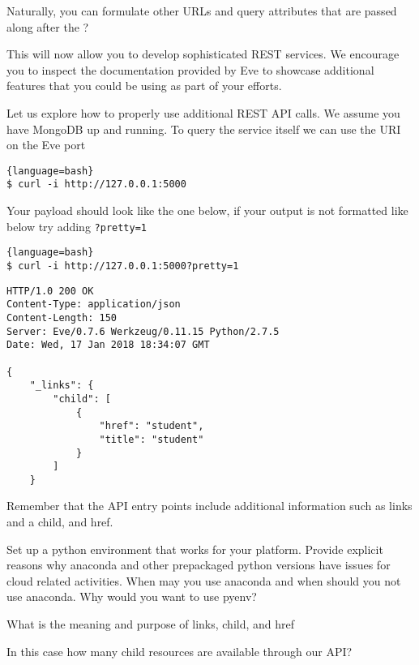 Naturally, you can formulate other URLs and query attributes that are
passed along after the ? 

This will now allow you to develop sophisticated REST services. We
encourage you to inspect the documentation provided by Eve to showcase
additional features that you could be using as part of your efforts.

Let us explore how to properly use additional REST API calls. We
assume you have MongoDB up and running. To query the service itself we
can use the URI on the Eve port


\begin{lstlisting}{language=bash}
$ curl -i http://127.0.0.1:5000
\end{lstlisting}

Your payload should look like the one below, if your output is not
formatted like below try adding \verb|?pretty=1|

\begin{lstlisting}{language=bash}
$ curl -i http://127.0.0.1:5000?pretty=1
\end{lstlisting}

\begin{lstlisting}
HTTP/1.0 200 OK
Content-Type: application/json
Content-Length: 150
Server: Eve/0.7.6 Werkzeug/0.11.15 Python/2.7.5
Date: Wed, 17 Jan 2018 18:34:07 GMT

{
    "_links": {
        "child": [
            {
                "href": "student",
                "title": "student"
            }
        ]
    }
\end{lstlisting}

Remember that the API entry points include additional information such
as links and a child, and href.



\begin{exercise}
Set up a python environment that works for your platform. Provide
explicit reasons why anaconda and other prepackaged python versions
have issues for cloud related activities. When may you use anaconda
and when should you not use anaconda. Why would you want to use pyenv?
\end{exercise}

\begin{exercise}
What is the meaning and purpose of links, child, and href
\end{exercise}

\begin{exercise}
In this case how many child resources are available through
our API?
\end{exercise}

